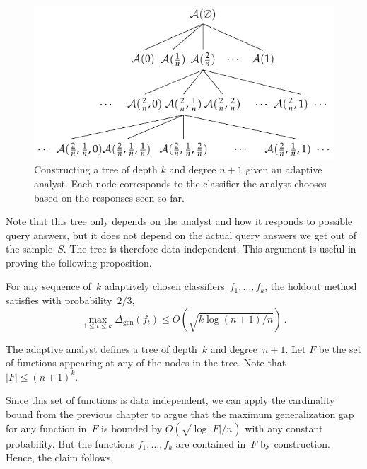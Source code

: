 \documentclass{tufte-book}
\begin{document}
\begin{figure}
\centering
\includegraphics[width=1\textwidth,height=\textheight]{assets/datasets-adaptivetree}
\caption{Constructing a tree of depth \(k\) and degree \(n+1\) given an
adaptive analyst. Each node corresponds to the classifier the analyst
chooses based on the responses seen so far.}
\end{figure}

Note that this tree only depends on the analyst and how it responds to
possible query answers, but it does not depend on the actual query
answers we get out of the sample~\(S\). The tree is therefore
data-independent. This argument is useful in proving the following
proposition.

\begin{Proposition}

For any sequence of~\(k\) adaptively chosen
classifiers~\(f_1,\dots, f_k\), the holdout method satisfies with
probability~\(2/3\), \[
\max_{1\le t\le k} \Delta_{\mathrm{gen}}(f_t) \le O\left(\sqrt{k\log(n+1)/n}\right)\,.
\]

\end{Proposition}

\begin{Proof}

The adaptive analyst defines a tree of depth~\(k\) and degree~\(n+1\).
Let \(F\) be the set of functions appearing at any of the nodes in the
tree. Note that~\(|F|\le (n+1)^k.\)

Since this set of functions is data independent, we can apply the
cardinality bound from the previous chapter to argue that the maximum
generalization gap for any function in~\(F\) is bounded by
\(O(\sqrt{\log|F|/n})\) with any constant probability. But the functions
\(f_1,\dots, f_k\) are contained in~\(F\) by construction. Hence, the
claim follows.

\end{Proof}
\end{document}
